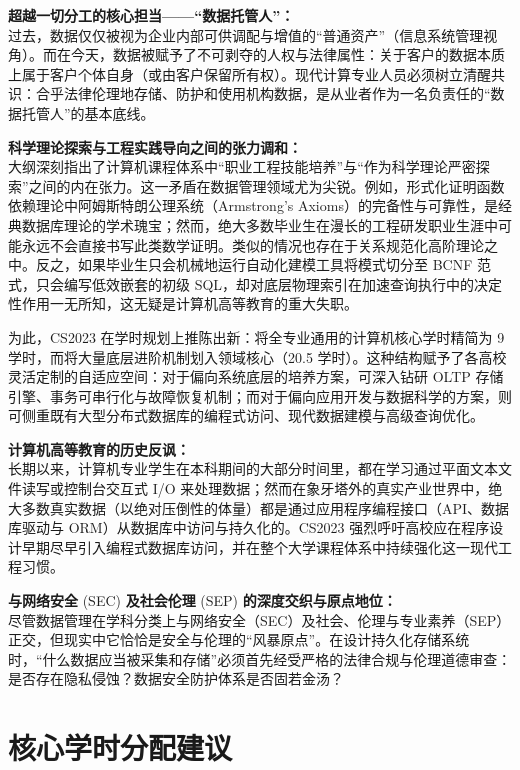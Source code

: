 \begin{preamblebox}[知识领域概述与时代演进]
\textbf{超越一切分工的核心担当——“数据托管人”：}\\
过去，数据仅仅被视为企业内部可供调配与增值的“普通资产”（信息系统管理视角）。而在今天，数据被赋予了不可剥夺的人权与法律属性：关于客户的数据本质上属于客户个体自身（或由客户保留所有权）。现代计算专业人员必须树立清醒共识：合乎法律伦理地存储、防护和使用机构数据，是从业者作为一名负责任的“数据托管人”的基本底线。

\textbf{科学理论探索与工程实践导向之间的张力调和：}\\
大纲深刻指出了计算机课程体系中“职业工程技能培养”与“作为科学理论严密探索”之间的内在张力。这一矛盾在数据管理领域尤为尖锐。例如，形式化证明函数依赖理论中阿姆斯特朗公理系统（Armstrong's Axioms）的完备性与可靠性，是经典数据库理论的学术瑰宝；然而，绝大多数毕业生在漫长的工程研发职业生涯中可能永远不会直接书写此类数学证明。类似的情况也存在于关系规范化高阶理论之中。反之，如果毕业生只会机械地运行自动化建模工具将模式切分至 BCNF 范式，只会编写低效嵌套的初级 SQL，却对底层物理索引在加速查询执行中的决定性作用一无所知，这无疑是计算机高等教育的重大失职。

为此，CS2023 在学时规划上推陈出新：将全专业通用的计算机核心学时精简为 9 学时，而将大量底层进阶机制划入领域核心（20.5 学时）。这种结构赋予了各高校灵活定制的自适应空间：对于偏向系统底层的培养方案，可深入钻研 OLTP 存储引擎、事务可串行化与故障恢复机制；而对于偏向应用开发与数据科学的方案，则可侧重既有大型分布式数据库的编程式访问、现代数据建模与高级查询优化。

\textbf{计算机高等教育的历史反讽：}\\
长期以来，计算机专业学生在本科期间的大部分时间里，都在学习通过平面文本文件读写或控制台交互式 I/O 来处理数据；然而在象牙塔外的真实产业世界中，绝大多数真实数据（以绝对压倒性的体量）都是通过应用程序编程接口（API、数据库驱动与 ORM）从数据库中访问与持久化的。CS2023 强烈呼吁高校应在程序设计早期尽早引入编程式数据库访问，并在整个大学课程体系中持续强化这一现代工程习惯。

\textbf{与网络安全} (SEC) \textbf{及社会伦理} (SEP) \textbf{的深度交织与原点地位：}\\
尽管数据管理在学科分类上与网络安全（SEC）及社会、伦理与专业素养（SEP）正交，但现实中它恰恰是安全与伦理的“风暴原点”。在设计持久化存储系统时，“什么数据应当被采集和存储”必须首先经受严格的法律合规与伦理道德审查：是否存在隐私侵蚀？数据安全防护体系是否固若金汤？
\end{preamblebox}

\section{核心学时分配建议}


